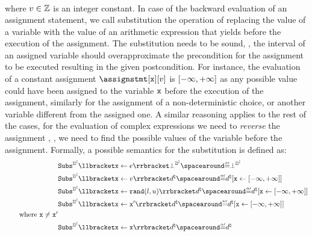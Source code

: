 \begin{description}
\begin{align*}
  \end{align*}
  where $v\in\mathbb{Z}$ is an integer constant.
  In case of the backward evaluation of an assignment statement, we call substitution the operation of replacing the value of a variable with the value of an arithmetic expression that yields before the execution of the assignment. The substitution needs to be sound, \ie, the interval of an assigned variable should overapproximate the precondition for the assignment to be executed resulting in the given postcondition.
  For instance, the evaluation of a constant assignment $\assignstmt[\defvariable][\defvalue]$ is $[-\infty, +\infty]$ as any possible value could have been assigned to the variable $\textup{\texttt{x}}$ before the execution of the assignment, similarly for the assignment of a non-deterministic choice, or another variable different from the assigned one. A similar reasoning applies to the rest of the cases, for the evaluation of complex expressions we need to \emph{reverse} the assignment , \ie, we need to find the possible values of the variable before the assignment.
  Formally, a possible semantics for the substitution is defined as:
  \begin{align*}
    &\intervalabstractdomainsubstitute \substitutionof{\defvariable}{\defaexp}\intervalabstractdomainbottom \DefeQ \intervalabstractdomainbottom \\
    &\intervalabstractdomainsubstitute \substitutionof{\defvariable}{\defvalue}\defabstractvalue \DefeQ \updatemem{\defabstractvalue}{\defvariable}{\intervaltop} \\
    &\intervalabstractdomainsubstitute \substitutionof{\defvariable}{\randval(l, u)}\defabstractvalue \DefeQ \updatemem{\defabstractvalue}{\defvariable}{\intervaltop} \\
    &\intervalabstractdomainsubstitute \substitutionof{\defvariable}{\defvariable'}\defabstractvalue \DefeQ \updatemem{\defabstractvalue}{\defvariable}{\intervaltop} \\ \tag*{where $\defvariable \neq \defvariable'$}\\
    &\intervalabstractdomainsubstitute \substitutionof{\defvariable}{\defvariable}\defabstractvalue \DefeQ \defabstractvalue \\

\end{align*}
\end{description}
